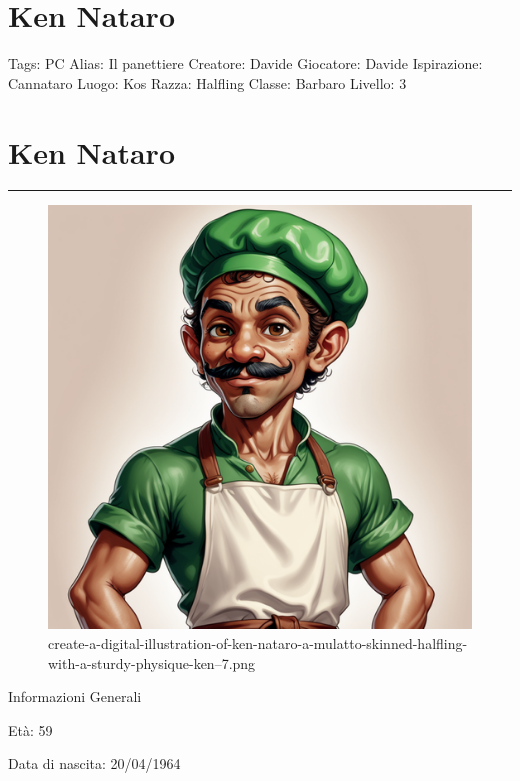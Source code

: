 \section{Ken Nataro}\label{ken-nataro}

Tags: PC Alias: Il panettiere Creatore: Davide Giocatore: Davide
Ispirazione: Cannataro Luogo: Kos Razza: Halfling Classe: Barbaro
Livello: 3

\section{Ken Nataro}\label{ken-nataro-1}

\begin{center}\rule{0.5\linewidth}{0.5pt}\end{center}

\begin{figure}
\centering
\includegraphics{create-a-digital-illustration-of-ken-nataro-a-mulatto-skinned-halfling-with-a-sturdy-physique-ken--7.png}
\caption{create-a-digital-illustration-of-ken-nataro-a-mulatto-skinned-halfling-with-a-sturdy-physique-ken--7.png}
\end{figure}

Informazioni Generali

Età: 59

Data di nascita: 20/04/1964

